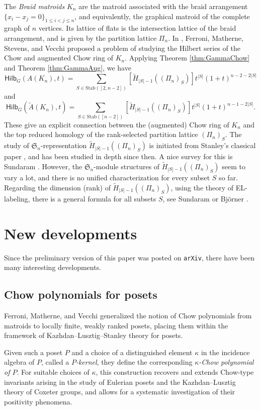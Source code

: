 \documentclass[reqno]{amsart}
\newcommand{\Stab}{{\mathrm{Stab}}}
\renewcommand{\S}{{\mathfrak{S}}}
\newcommand{\Hilb}{{\mathsf{Hilb}}}
\theoremstyle{definition}
\theoremstyle{remark}
\begin{document}
The \emph{Braid matroids} $K_n$ are the matroid associated with the braid arrangement $\{x_i-x_j=0\}_{1\le i<j\le n}$, and equivalently, the graphical matroid of the complete graph of $n$ vertices. Its lattice of flats is the intersection lattice of the braid arrangement, and is given by the partition lattice $\Pi_n$.
In \cite{Ferroni2024hilbert}, Ferroni, Matherne, Stevens, and Vecchi proposed a problem of studying the Hilbert series of the Chow and augmented Chow ring of $K_n$. Applying Theorem \ref{thm:GammaChow} and Theorem \ref{thm:GammaAug}, we have
\[
    \Hilb_G(A(K_n),t)=\sum_{S\in \Stab([2,n-2])}[\tilde{H}_{|S|-1}(({\Pi_n})_S)] t^{|S|}(1+t)^{n-2-2|S|}
\]
and 
\[
    \Hilb_G(\widetilde{A}(K_n),t)=\sum_{S\in \Stab([n-2])}[\tilde{H}_{|S|-1}(({\Pi_n})_S)] t^{|S|}(1+t)^{n-1-2|S|}.
\]
These give an explicit connection between the (augmented) Chow ring of $K_n$ and the top reduced homology of the rank-selected partition lattice $(\Pi_n)_S$. The study 
of $\S_n$-representation $\tilde{H}_{|S|-1}(({\Pi_n})_S)$ is initiated from Stanley's classical paper \cite{Stanley1982GroupPoset}, and has been studied in depth since then. A nice survey for this is Sundaram \cite{SundaramPartitionSurvey}. However, the $\S_n$-module structures of $\tilde{H}_{|S|-1}(({\Pi_n})_S)$ seem to vary a lot, and there is no unified characterization for every subset $S$ so far. Regarding the dimension (rank) of $\tilde{H}_{|S|-1}(({\Pi_n})_S)$, using the theory of EL-labeling, there is a general formula for all subsets $S$, see Sundaram \cite[Prop. 2.18]{SundaramPartition1994} or Bj\"{o}rner \cite[p.276, Exercise 7.33]{BjornerMatroidChapter}.


\section{New developments} \label{sec: Developments}
Since the preliminary version of this paper was posted on \texttt{arXiv}, there have been many interesting developments. 

\subsection{Chow polynomials for posets}
Ferroni, Matherne, and Vecchi \cite{FMVChowPoly} generalized the notion of Chow polynomials from matroids to locally finite, weakly ranked posets, placing them within the framework of Kazhdan--Lusztig--Stanley theory for posets.


Given such a poset $P$ and a choice of a distinguished element $\kappa$ in the incidence algebra of $P$, called a \emph{$P$-kernel}, they define the corresponding \emph{$\kappa$-Chow polynomial of $P$}.
For suitable choices of $\kappa$, this construction recovers and extends Chow-type invariants arising in the study of Eulerian posets and the Kazhdan--Lusztig theory of Coxeter groups, and allows for a systematic investigation of their positivity phenomena.
\end{document}
